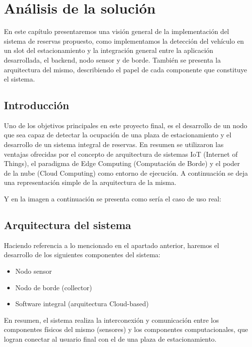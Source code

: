 \newpage
\section{Análisis de la solución}
En este capítulo presentaremos una visión general de la implementación del sistema de reservas propuesto, como implementamos la detección del vehículo en un slot del estacionamiento y la integración general entre la aplicación desarrollada, el backend, nodo sensor y de borde. También se presenta la arquitectura del mismo, describiendo el papel de cada componente que constituye el sistema.


\subsection{Introducción}
Uno de los objetivos principales en este proyecto final, es el desarrollo de un nodo que sea capaz de detectar la ocupación de una plaza de estacionamiento y el desarrollo de un sistema integral de reservas. En resumen se utilizaron las ventajas ofrecidas por el concepto de arquitectura de sistemas IoT (Internet of Things), el paradigma de Edge Computing (Computación de Borde) y el poder de la nube (Cloud Computing) como entorno de ejecución. A continuación se deja una representación simple de la arquitectura de la misma.


Y en la imagen a continuación se presenta como sería el caso de uso real:

\subsection{Arquitectura del sistema}
Haciendo referencia a lo mencionado en el apartado anterior, haremos el desarrollo de los siguientes componentes del sistema:

\begin{itemize}
    \item Nodo sensor
    \item Nodo de borde (collector)
    \item Software integral (arquitectura Cloud-based)
\end{itemize}

En resumen, el sistema realiza la interconexión y comunicación entre los componentes físicos del mismo (sensores) y los componentes computacionales, que logran conectar al usuario final con el de una plaza de estacionamiento.





